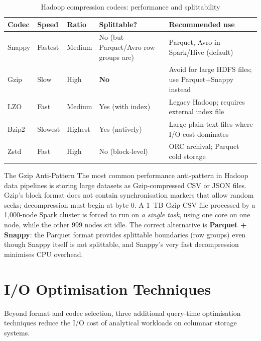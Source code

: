\begin{table}[h!t]
\centering
\caption{Hadoop compression codecs: performance and splittability}
\label{tab:codecs}
\renewcommand{\arraystretch}{1.5}
\begin{tabular}{L{1.6cm} L{1.4cm} L{1.4cm} L{1.4cm} L{4.0cm}}
\toprule
\textbf{Codec} & \textbf{Speed} & \textbf{Ratio} & \textbf{Splittable?} &
\textbf{Recommended use} \\
\midrule
Snappy & Fastest & Medium   & No (but Parquet/Avro row groups are) & Parquet, Avro in Spark/Hive (default) \\
Gzip   & Slow    & High     & \textbf{No} & Avoid for large HDFS files; use Parquet+Snappy instead \\
LZO    & Fast    & Medium   & Yes (with index) & Legacy Hadoop; requires external index file \\
Bzip2  & Slowest & Highest  & Yes (natively) & Large plain-text files where I/O cost dominates \\
Zstd   & Fast    & High     & No (block-level) & ORC archival; Parquet cold storage \\
\bottomrule
\end{tabular}
\end{table}

\begin{caution}{The Gzip Anti-Pattern}
The most common performance anti-pattern in Hadoop data pipelines is
storing large datasets as Gzip-compressed CSV or JSON files.
Gzip's block format does not contain synchronisation markers that allow
random seeks; decompression must begin at byte 0. A 1~TB Gzip CSV file
processed by a 1{,}000-node Spark cluster is forced to run on
\emph{a single task}, using one core on one node, while the other
999 nodes sit idle. The correct alternative is \textbf{Parquet + Snappy}:
the Parquet format provides splittable boundaries (row groups) even
though Snappy itself is not splittable, and Snappy's very fast
decompression minimises CPU overhead.
\end{caution}

\section{I/O Optimisation Techniques}
\label{sec:io-opt}

Beyond format and codec selection, three additional query-time
optimisation techniques reduce the I/O cost of analytical workloads
on columnar storage systems.

